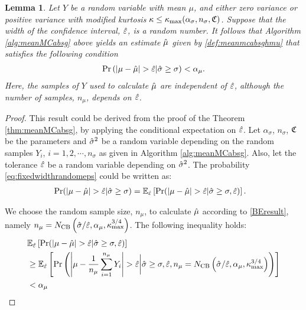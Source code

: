 \documentclass{iitthesis}
\newtheorem{lemma}[theorem]{Lemma}
\theoremstyle{definition}
\begin{document}
\begin{lemma}\label{thm:fixedwidthrandomeps}
Let $Y$ be a random variable with mean $\mu$, and either zero variance or positive variance with modified kurtosis $\kappa \leq \kappa_{\max}(\alpha_\sigma, n_\sigma, \mathfrak{C})$. Suppose that the width of the confidence interval, $\hat{\varepsilon}$, is a random number. It follows that Algorithm \ref{alg:meanMCabsg} above yields an estimate $\hat{\mu}$ given by \eqref{def:meanmcabsghmu} that satisfies the following condition
\begin{align}\label{eq:fixedwidthrandomeps}
\Pr\left( \left \lvert \mu-\hat{\mu} \right \rvert > \hat{\varepsilon} |\hat{\sigma} \geq \sigma \right) <\alpha_\mu.
\end{align}
Here, the samples of $Y$ used to calculate $\hat{\mu}$ are independent of $\hat{\varepsilon}$, although the number of samples, $n_\mu$, depends on $\hat{\varepsilon}$.
\end{lemma}
\begin{proof}
This result could be derived from the proof of the Theorem \ref{thm:meanMCabsg}, by applying the conditional expectation on $\hat{\varepsilon}$.
Let $\alpha_\sigma$, $n_\sigma$, $\mathfrak{C}$ be the parameters and $\hat{\sigma}^2$ be a random variable depending on the random samples $Y_i$, $i = 1,2,\cdots, n_{\sigma}$ as given in Algorithm \ref{alg:meanMCabsg}. Also, let the tolerance $\hat{\varepsilon}$ be a random variable depending on $\hat{\sigma}^2$. 
The probability \eqref{eq:fixedwidthrandomeps} could be written as:
\begin{align}
&\Pr(\left \lvert \mu-\hat{\mu} \right \rvert > \hat{\varepsilon}|\hat{\sigma} \geq \sigma) = \mathbb{E}_{\hat{\varepsilon}}\left[\Pr({\left \lvert \mu-\hat{\mu} \right \rvert  > \hat{\varepsilon}}| \hat{\sigma}\geq\sigma , \hat{\varepsilon})\right].
\end{align}

We choose the random sample size, $n_\mu$, to calculate $\hat{\mu}$ according to \eqref{BEresult}, namely $n_\mu= N_{\text{CB}}\left(\hat{\sigma}/\hat{\varepsilon},\alpha_\mu, \kappa_{\max}^{3/4}\right)$. 
The following inequality holds:
\begin{align*}
&\mathbb{E}_{\hat{\varepsilon}}\left[\Pr({\left \lvert \mu-\hat{\mu} \right \rvert  > \hat{\varepsilon}}| \hat{\sigma}\geq\sigma , \hat{\varepsilon})\right]\\
&\geq \mathbb{E}_{\hat{\varepsilon}}\left[\Pr\left({\left \lvert \mu-\frac{1}{n_\mu}\sum_{i=1}^{n_\mu}Y_i \right \rvert > \hat{\varepsilon}}\bigg \vert \hat{\sigma}\geq\sigma , \hat{\varepsilon}, n_\mu= N_{\text{CB}}\left(\hat{\sigma}/\hat{\varepsilon},\alpha_\mu, \kappa_{\max}^{3/4}\right)\right)\right]\\
&<\alpha_\mu
\end{align*}
\end{proof}
\end{document}
